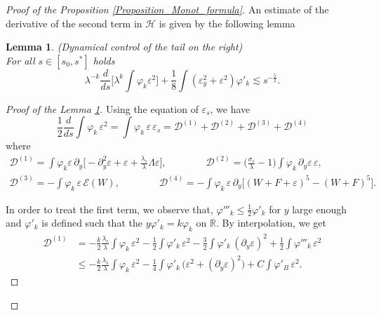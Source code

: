 \documentclass[16pt,english, oneside,reqno]{smfart}
\newcommand{\RR}{\mathbb{R}}
\newcommand{\vare}{{\varepsilon}}
\newcommand{\vphi}{{\varphi}}
\newtheorem{lemma}[theorem]{Lemma}
\begin{document}
\begin{proof}[Proof of the Proposition \ref{Proposition_Monot_formula}]
\vspace{0.4cm}
An estimate of the derivative of 
the second term in $\mathcal{H}$ is given by the following lemma
\begin{lemma}(Dynamical control of the tail on the right)\label{lemma_control_of_scaling_term}\\
    For all $s\in[s_0,s^*]$ holds
\begin{equation}\label{scaling_term_estimate}
    \lambda^{-k}\frac{d}{ds}\Big[ \lambda^k \int \vphi_k \vare^2 \Big] + \frac{1}{8}\int (\vare^2_y+\vare^2)\vphi'_k \lesssim s^{-\frac{5}{2}}.
\end{equation}
\end{lemma}
\begin{proof}[Proof of the Lemma \ref{lemma_control_of_scaling_term}]
Using the equation of $\vare_s$, we have
\begin{equation}
        \frac{1}{2}\frac{d}{ds}\int \vphi_k\,\vare^2 = \int \vphi_k \,\vare\,\vare_s = \mathcal{D}^{(1)} + \mathcal{D}^{(2)} + \mathcal{D}^{(3)} + \mathcal{D}^{(4)}
\end{equation}
where
\begin{equation}
    \begin{split}
        \mathcal{D}^{(1)} = \int \vphi_k \vare \,\partial_y\big[ -\partial_y^2 \vare + \vare
        + \frac{\lambda_s}{\lambda}\Lambda \vare \big] ,
        \qquad \qquad
        \mathcal{D}^{(2)} = \Big( \frac{\sigma_s}{\lambda}-1 \Big)\int \vphi_k\, \partial_y \vare\, \vare ,\\
        \mathcal{D}^{(3)} = - \int \vphi_k\,\vare \, \mathcal{E}(W) , \qquad \qquad
        \mathcal{D}^{(4)} = -\int \vphi_k \,\vare\, \partial_y\big[ (W+F+\vare)^5 - (W+F)^5 \big].
    \end{split}
\end{equation}

In order to treat the first term, we observe that, $\vphi'''_k \leq \frac{1}{2}\vphi'_k$ for $y$ large  enough and $\vphi'_k$ is defined such that the $y\vphi'_k = k \vphi_k$ on $\RR$. By interpolation, we get
\begin{equation}
    \begin{split}
        \mathcal{D}^{(1)}  & = -\frac{k}{2}\frac{\lambda_s}{\lambda}\int \vphi_k\,\vare^2 - \frac{1}{2}\int \vphi'_k\,\vare^2 - \frac{3}{2}\int \vphi'_k\,(\partial_y \vare)^2 + \frac{1}{2}\int \vphi'''_k \,\vare^2\\
        & \leq
        -\frac{k}{2} \frac{\lambda_s}{\lambda}\int \vphi_k \,\vare^2 - \frac{1}{4}\int \vphi'_k \, \big( \vare^2 + (\partial_y \vare)^2 \big) + C \int \vphi'_B\,\vare^2.
    \end{split}
\end{equation}


\end{proof}
\end{proof}
\end{document}
